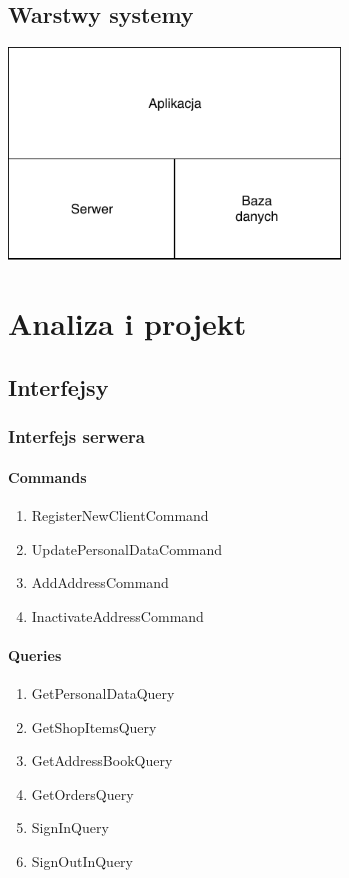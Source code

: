 \documentclass[10pt]{report}
\begin{document}
		\section{Warstwy systemy}
			\begin{center}
				\includegraphics[width=250pt]{layers.pdf}
			\end{center}
		

	\renewcommand{\thesection}{\thechapter.\arabic{section}}	
	

	
\chapter{Analiza i projekt}


\section{Interfejsy}


\subsection{Interfejs serwera}

\subsubsection{Commands}

\begin{enumerate}
	\item RegisterNewClientCommand
	\item UpdatePersonalDataCommand
	\item AddAddressCommand
	\item InactivateAddressCommand
	
\end{enumerate} 

	
\subsubsection{Queries}
\begin{enumerate}
	\item GetPersonalDataQuery
	\item GetShopItemsQuery
	\item GetAddressBookQuery
	\item GetOrdersQuery
	\item SignInQuery
	\item SignOutInQuery
\end{enumerate}	
\end{document}
